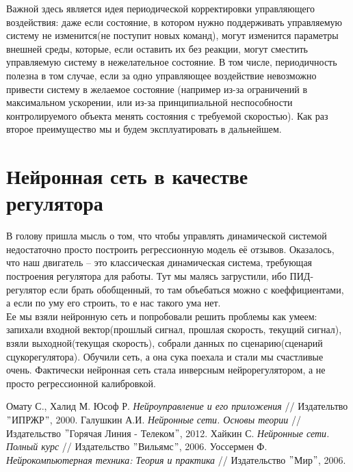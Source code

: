 \documentclass[14pt]{extreport}
\begin{document}
            Важной здесь является идея периодической корректировки управляющего воздействия: даже если состояние, в котором нужно поддерживать управляемую систему не изменится(не поступит новых команд), могут изменится параметры внешней среды, которые, если оставить их без реакции, могут сместить управляемую систему в нежелательное состояние. В том числе, периодичность полезна в том случае, если за одно управляющее воздействие невозможно привести систему в желаемое состояние (например из-за ограничений в максимальном ускорении, или из-за принципиальной неспособности контролируемого объекта менять состояния с требуемой скоростью). Как раз второе преимущество мы и будем эксплуатировать в дальнейшем.
        \section{Нейронная сеть в качестве регулятора}
            В голову пришла мысль о том, что чтобы управлять динамической системой недостаточно просто построить регрессионную модель её отзывов. Оказалось, что наш двигатель -- это классическая динамическая система, требующая построения регулятора для работы. Тут мы малясь загрустили, ибо ПИД-регулятор если брать обобщенный, то там объебаться можно с коеффициентами, а если по уму его строить, то е нас такого ума нет.\\
            Ее мы взяли нейронную сеть и попробовали решить проблемы как умеем: запихали входной вектор(прошлый сигнал, прошлая скорость, текущий сигнал), взяли выходной(текущая скорость), собрали данных по сценарию(сценарий сцукорегулятора). Обучили сеть, а она сука поехала и стали мы счастливые очень. Фактически нейронная сеть стала инверсным нейрорегулятором, а не просто регрессионной калибровкой.
\newpage
        \begin{thebibliography}{99}
             Омату С., Халид М. Юсоф Р. {\it Нейроуправление и его приложения} // Издательтво $"$ИПРЖР$"$, 2000.
             Галушкин А.И. {\it Нейронные сети. Основы теории} // Издательство $"$Горячая Линия - Телеком$"$, 2012.
             Хайкин С. {\it Нейронные сети. Полный курс} // Издательство $"$Вильямс$"$, 2006.
             Уоссермен Ф. {\it Нейрокомпьютерная техника: Теория и практика} // Издательство $"$Мир$"$, 2006.
        \end{thebibliography}
\end{document}
